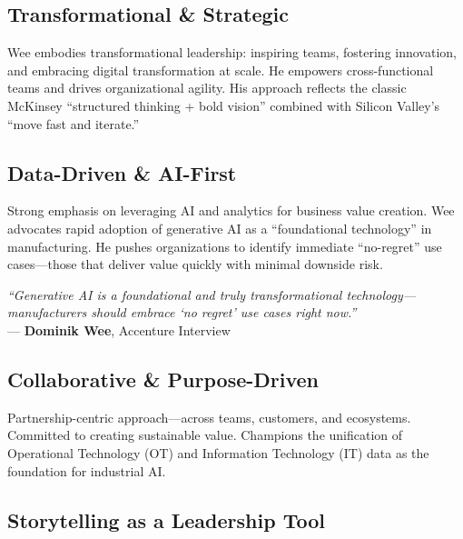\documentclass[11pt,a4paper]{article}
\begin{document}
\subsection{Transformational \& Strategic}

Wee embodies transformational leadership: inspiring teams, fostering innovation, and embracing digital transformation at scale. He empowers cross-functional teams and drives organizational agility. His approach reflects the classic McKinsey ``structured thinking + bold vision'' combined with Silicon Valley's ``move fast and iterate.''

\subsection{Data-Driven \& AI-First}

Strong emphasis on leveraging AI and analytics for business value creation. Wee advocates rapid adoption of generative AI as a ``foundational technology'' in manufacturing. He pushes organizations to identify immediate ``no-regret'' use cases---those that deliver value quickly with minimal downside risk.

\begin{center}
\begin{tcolorbox}[
    colback=mslightgray,
    colframe=mslightblue,
    boxrule=0.5pt,
    arc=3pt,
    left=10pt, right=10pt, top=8pt, bottom=8pt,
    width=0.85\textwidth
]
\textit{``Generative AI is a foundational and truly transformational technology---manufacturers should embrace `no regret' use cases right now.''}\\[5pt]
\hfill --- \textbf{Dominik Wee}, Accenture Interview
\end{tcolorbox}
\end{center}

\subsection{Collaborative \& Purpose-Driven}

Partnership-centric approach---across teams, customers, and ecosystems. Committed to creating sustainable value. Champions the unification of Operational Technology (OT) and Information Technology (IT) data as the foundation for industrial AI.

\subsection{Storytelling as a Leadership Tool}
\end{document}
